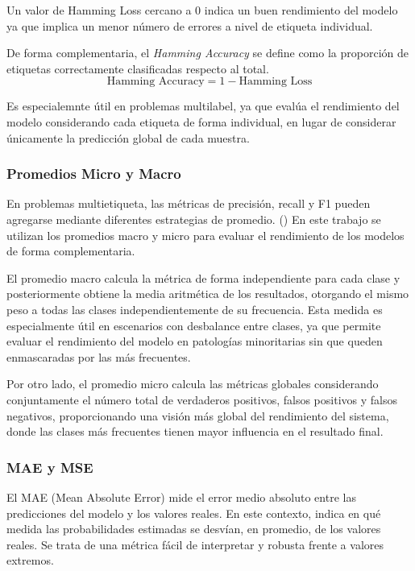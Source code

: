 \documentclass[12pt,a4paper,twoside]{book}
\begin{document}
Un valor de Hamming Loss cercano a 0 indica un buen rendimiento del modelo ya que implica un menor número de errores a nivel de etiqueta individual. 

De forma complementaria, el \textit{Hamming Accuracy} se define como la proporción de etiquetas correctamente clasificadas respecto al total.
\begin{equation*}
	\text{Hamming Accuracy} = 1 - \text{Hamming Loss}
\end{equation*}

Es especialemnte útil en problemas multilabel, ya que evalúa el rendimiento del modelo considerando cada etiqueta de forma individual, en lugar de considerar únicamente la predicción global de cada muestra.

\subsubsection*{Promedios Micro y Macro}

En problemas multietiqueta, las métricas de precisión, recall y F1 pueden agregarse mediante diferentes estrategias de promedio. (\cite{qlik_multiclass_scoring})
En este trabajo se utilizan los promedios macro y micro para evaluar el rendimiento de los modelos de forma complementaria.

El promedio macro calcula la métrica de forma independiente para cada clase y posteriormente obtiene la media aritmética de los resultados, otorgando el mismo peso a todas las clases independientemente de su frecuencia. 
Esta medida es especialmente útil en escenarios con desbalance entre clases, ya que permite evaluar el rendimiento del modelo en patologías minoritarias sin que queden enmascaradas por las más frecuentes.

Por otro lado, el promedio micro calcula las métricas globales considerando conjuntamente el número total de verdaderos positivos, falsos positivos y falsos negativos, proporcionando una visión más global del rendimiento del sistema, donde las clases más frecuentes tienen mayor influencia en el resultado final.

\subsubsection*{MAE y MSE}

El MAE (Mean Absolute Error) mide el error medio absoluto entre las predicciones del modelo y los valores reales. 
En este contexto, indica en qué medida las probabilidades estimadas se desvían, en promedio, de los valores reales. 
Se trata de una métrica fácil de interpretar y robusta frente a valores extremos.
\end{document}
